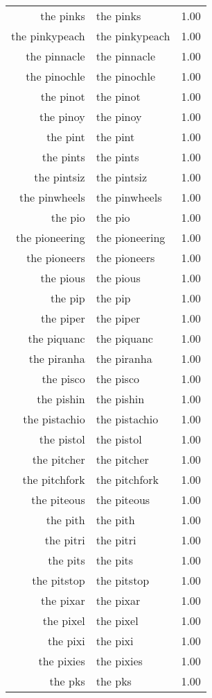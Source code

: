 \begin{table}[ht]
\begin{tabular}{rlr}
  the pinks & the pinks & 1.00 \\ 
  the pinkypeach & the pinkypeach & 1.00 \\ 
  the pinnacle & the pinnacle & 1.00 \\ 
  the pinochle & the pinochle & 1.00 \\ 
  the pinot & the pinot & 1.00 \\ 
  the pinoy & the pinoy & 1.00 \\ 
  the pint & the pint & 1.00 \\ 
  the pints & the pints & 1.00 \\ 
  the pintsiz & the pintsiz & 1.00 \\ 
  the pinwheels & the pinwheels & 1.00 \\ 
  the pio & the pio & 1.00 \\ 
  the pioneering & the pioneering & 1.00 \\ 
  the pioneers & the pioneers & 1.00 \\ 
  the pious & the pious & 1.00 \\ 
  the pip & the pip & 1.00 \\ 
  the piper & the piper & 1.00 \\ 
  the piquanc & the piquanc & 1.00 \\ 
  the piranha & the piranha & 1.00 \\ 
  the pisco & the pisco & 1.00 \\ 
  the pishin & the pishin & 1.00 \\ 
  the pistachio & the pistachio & 1.00 \\ 
  the pistol & the pistol & 1.00 \\ 
  the pitcher & the pitcher & 1.00 \\ 
  the pitchfork & the pitchfork & 1.00 \\ 
  the piteous & the piteous & 1.00 \\ 
  the pith & the pith & 1.00 \\ 
  the pitri & the pitri & 1.00 \\ 
  the pits & the pits & 1.00 \\ 
  the pitstop & the pitstop & 1.00 \\ 
  the pixar & the pixar & 1.00 \\ 
  the pixel & the pixel & 1.00 \\ 
  the pixi & the pixi & 1.00 \\ 
  the pixies & the pixies & 1.00 \\ 
  the pks & the pks & 1.00 \\ 

\end{tabular}
\end{table}

